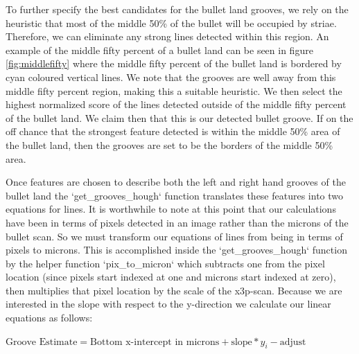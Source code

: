 \documentclass[12pt]{article}
\theoremstyle{nonumberplain}
\begin{document}
To further specify the best candidates for the bullet land grooves, we rely on the heuristic that most of the middle 50\% of the bullet will be occupied by striae. Therefore, we can eliminate any strong lines detected within this region. An example of the middle fifty percent of a bullet land can be seen in figure \ref{fig:middlefifty} where the middle fifty percent of the bullet land is bordered by cyan coloured vertical lines. We note that the grooves are well away from this middle fifty percent region, making this a suitable heuristic. We then select the highest normalized score of the lines detected outside of the middle fifty percent of the bullet land. We claim then that this is our detected bullet groove. If on the off chance that the strongest feature detected is within the middle 50\% area of the bullet land, then the grooves are set to be the borders of the middle 50\% area. 

Once features are chosen to describe both the left and right hand grooves of the bullet land the `get\_grooves\_hough` function translates these features into two equations for lines. It is worthwhile to note at this point that our calculations have been in terms of pixels detected in an image rather than the microns of the bullet scan. So we must transform our equations of lines from being in terms of pixels to microns. This is accomplished inside the `get\_grooves\_hough` function by the helper function `pix\_to\_micron` which subtracts one from the pixel location (since pixels start indexed at one and microns start indexed at zero), then multiplies that pixel location by the scale of the x3p-scan. Because we are interested in the slope with respect to the y-direction we calculate our linear equations as follows:

\begin{center}
  $\text{Groove Estimate} = \text{Bottom x-intercept in microns} + \text{slope}*y_{i} - \text{adjust}$
\end{center}
\end{document}
